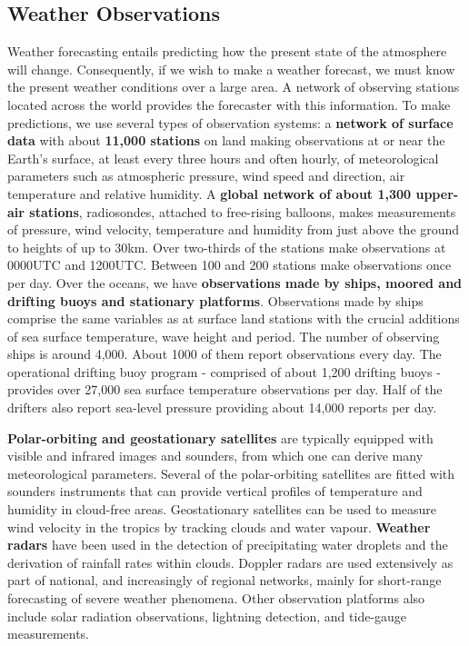 \documentclass[12pt,oneside]{book}
\begin{document}
\subsection{Weather Observations}\label{weather-observations}

Weather forecasting entails predicting how the present state of the
atmosphere will change. Consequently, if we wish to make a weather
forecast, we must know the present weather conditions over a large area.
A network of observing stations located across the world provides the
forecaster with this information. To make predictions, we use several
types of observation systems: a \textbf{network of surface data} with
about \textbf{11,000 stations} on land making observations at or near
the Earth's surface, at least every three hours and often hourly, of
meteorological parameters such as atmospheric pressure, wind speed and
direction, air temperature and relative humidity. A \textbf{global
network of about 1,300 upper-air stations}, radiosondes, attached to
free-rising balloons, makes measurements of pressure, wind velocity,
temperature and humidity from just above the ground to heights of up to
30km. Over two-thirds of the stations make observations at 0000UTC and
1200UTC. Between 100 and 200 stations make observations once per day.
Over the oceans, we have \textbf{observations made by ships, moored and
drifting buoys and stationary platforms}. Observations made by ships
comprise the same variables as at surface land stations with the crucial
additions of sea surface temperature, wave height and period. The number
of observing ships is around 4,000. About 1000 of them report
observations every day. The operational drifting buoy program -
comprised of about 1,200 drifting buoys - provides over 27,000 sea
surface temperature observations per day. Half of the drifters also
report sea-level pressure providing about 14,000 reports per day.

\textbf{Polar-orbiting and geostationary satellites} are typically
equipped with visible and infrared images and sounders, from which one
can derive many meteorological parameters. Several of the polar-orbiting
satellites are fitted with sounders instruments that can provide
vertical profiles of temperature and humidity in cloud-free areas.
Geostationary satellites can be used to measure wind velocity in the
tropics by tracking clouds and water vapour. \textbf{Weather radars}
have been used in the detection of precipitating water droplets and the
derivation of rainfall rates within clouds. Doppler radars are used
extensively as part of national, and increasingly of regional networks,
mainly for short-range forecasting of severe weather phenomena. Other
observation platforms also include solar radiation observations,
lightning detection, and tide-gauge measurements.
\end{document}
